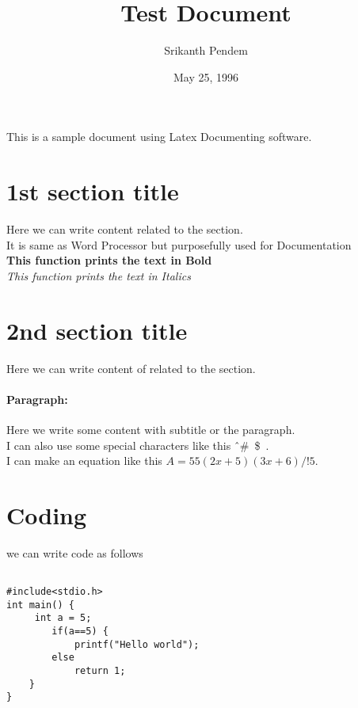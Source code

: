 \documentclass{article}
\title{Test Document}
\date{May 25, 1996}
\author{Srikanth Pendem}
\begin{document}
\maketitle
\newpage
This is a sample document using Latex Documenting software.

\section{1st section title}
Here we can write content related to the section.\\

It is same as Word Processor but purposefully used for Documentation\\

\textbf{This function prints the text in Bold} \\

\textit{This function prints the text in Italics}

\section{2nd section title}
Here we can write content of related to the section. \\

\paragraph{Paragraph:}
Here we write some content with subtitle or the paragraph. \\

I can also use some special characters like this \^\ \#\ \$\ . \\
I can make an equation like this $A=55 (2x+5)(3x+6)/!5$. \\

\section{Coding}
we can write code as follows

\begin{verbatim}

#include<stdio.h>
int main() {
     int a = 5;
	 	if(a==5) {
		  	printf("Hello world");
	 	else
		  	return 1;
	}
}    
\end{verbatim}
\end{document}
